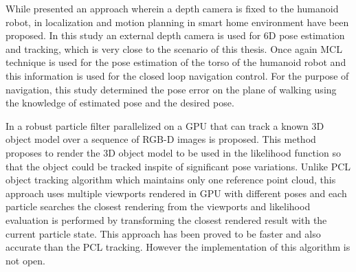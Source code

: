 While \cite{maier2012real} presented an approach wherein a depth camera is fixed to the humanoid robot, in \cite{cervera2012localization} localization and motion planning in smart home environment have been proposed. In this study an external depth camera is used for 6D pose estimation and tracking, which is very close to the scenario of this thesis. Once again MCL technique is used for the pose estimation of the torso of the humanoid robot and this information is used for the closed loop navigation control. For the purpose of navigation, this study determined the pose error on the plane of walking using the knowledge of estimated pose and the desired pose. 
	
In \cite{choi2013rgb} a robust particle filter parallelized on a GPU that can track a known 3D object model over a sequence of RGB-D images is proposed. This method proposes to render the 3D object model to be used in the likelihood function so that the object could be tracked inspite of significant pose variations. Unlike PCL object tracking algorithm \cite{rusu20113d} which maintains only one reference point cloud, this approach uses multiple viewports rendered in GPU with different poses and each particle searches the closest rendering from the viewports and likelihood evaluation is performed by transforming the closest rendered result with the current particle state. This approach has been proved to be faster and also accurate than the PCL tracking. However the implementation of this algorithm is not open.
	
